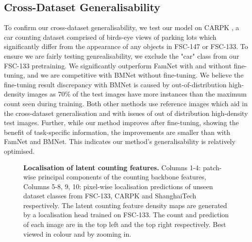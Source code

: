 \documentclass[letterpaper, 11pt]{IEEEtran}
\begin{document}
 \subsection{Cross-Dataset Generalisability}
To confirm our cross-dataset generalisability, we test our model on CARPK \cite{hsieh2017drone}, a car counting dataset
comprised of birds-eye views of parking lots which significantly differ from the appearance of any objects in FSC-147 or FSC-133. To ensure we are fairly testing genrealisability, we exclude the "car" class from our FSC-133 pretraining. 
We significantly outperform FamNet with and without fine-tuning, and we are competitive with BMNet without fine-tuning. We believe the fine-tuning result discrepancy with BMNet is caused by 
 out-of-distribution high-density images as
70\% of the test images have more instances than the maximum count seen during training.
Both other methods use reference images which  aid in the cross-dataset generalisation and with issues of out of distribution high-density test images. 
Further, while our method improves after fine-tuning, showing the benefit of task-specific information, the improvements are smaller than with FamNet and BMNet. 
This indicates our method's generalisability is relatively optimised.

\begin{table}
    \centering
    \fontsize{9}{9}\selectfont
    
    \caption{\textbf{Generalisation performance on CARPK.} ``Pretrained'' models were trained on FSC-147 or, for our method, FSC-133. ``Fine-tuned'' models were further trained on the CARPK dataset. 
    We highlight the top results with and without reference images and with and without fine-tuning.
    \label{table_carpk}
}
\end{table}

\begin{figure}
    \centering
    
    \caption{\textbf{Localisation of latent counting features.} Columns 1-4: patch-wise principal components of the counting backbone features, Columns 5-8, 9, 10: pixel-wise localisation predictions of unseen dataset classes from FSC-133, CARPK and ShanghaiTech respectively. The latent counting feature density maps are generated by a localisation head trained on FSC-133.
The count and prediction of each image are in the top left and the top right respectively.  Best viewed in colour and by zooming in.
    }
    \label{figure_visualisation}
\end{figure}
\end{document}
